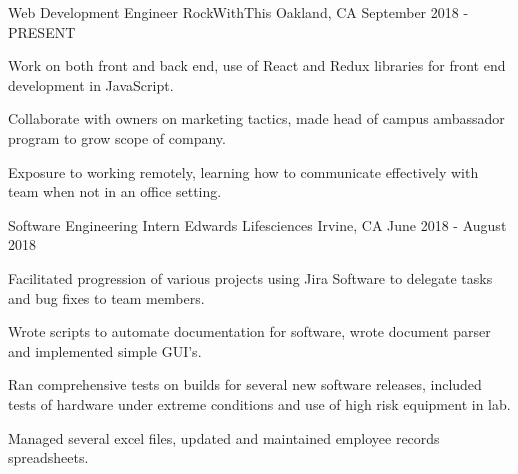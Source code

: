 \documentclass[11pt, a4paper]{awesome-cv}
\begin{document}
\begin{cventries}

  \cventry
    {Web Development Engineer} %
    {RockWithThis} %
    {Oakland, CA} %
    {September 2018 - PRESENT} %
    {
      \begin{cvitems} %
        \item {Work on both front and back end, use of React and Redux libraries for front end development in JavaScript.}
        \item {Collaborate with owners on marketing tactics, made head of campus ambassador program to grow scope of company.}
        \item {Exposure to working remotely, learning how to communicate effectively with team when not in an office setting.}
      \end{cvitems}
    }


  \cventry
    {Software Engineering Intern} %
    {Edwards Lifesciences} %
    {Irvine, CA} %
    {June 2018 - August 2018} %
    {
      \begin{cvitems} %
        \item {Facilitated progression of various projects using Jira Software to delegate tasks and bug fixes to team members.}
        \item {Wrote scripts to automate documentation for software, wrote document parser and implemented simple GUI's.}
        \item {Ran comprehensive tests on builds for several new software releases, included tests of hardware under extreme conditions and use of high risk equipment in lab.}
        \item {Managed several excel files, updated and maintained employee records spreadsheets.}
      \end{cvitems}
    }

\end{cventries}
\end{document}
